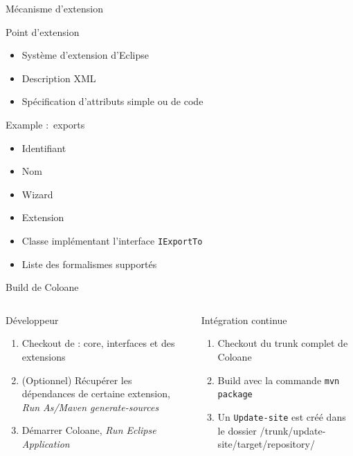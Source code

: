 \documentclass{beamer}
\begin{document}
\begin{frame}{Mécanisme d'extension}
\begin{block}{Point d'extension}
	\begin{itemize}
	\item Système d'extension d'Eclipse
	\item Description XML
	\item Spécification d'attributs simple ou de code
	\end{itemize}
\end{block}
\begin{exampleblock}{Example : exports}
	\begin{itemize}
	\item Identifiant
	\item Nom
	\item Wizard
	\item Extension
	\item Classe implémentant l'interface \texttt{IExportTo}
	\item Liste des formalismes supportés
	\end{itemize}
\end{exampleblock}
\end{frame}



\begin{frame}{Build de Coloane}
\begin{columns}[t]
	\begin{column}{6cm}
		\begin{block}{Développeur}
			\begin{enumerate}
			\item Checkout de : core, interfaces et des extensions
			\item (Optionnel) Récupérer les dépendances de certaine extension, \textit{Run As/Maven generate-sources}
			\item Démarrer Coloane, \textit{Run Eclipse Application}
			\end{enumerate}
		\end{block}
	\end{column}
	\begin{column}{5cm}
		\begin{alertblock}{Intégration continue}
			\begin{enumerate}
			\item Checkout du trunk complet de Coloane
			\item Build avec la commande \texttt{mvn package}
			\item Un \texttt{Update-site} est créé dans le dossier /trunk/update-site/target/repository/
			\end{enumerate}
		\end{alertblock}
	\end{column}
\end{columns}
\end{frame}
\end{document}
